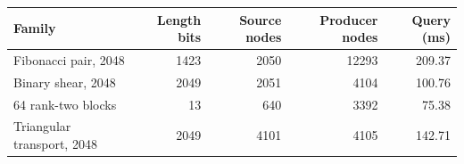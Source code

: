 \begin{center}
\small
\begin{tabular}{lrrrr}
\toprule
Family & Length bits & Source nodes & Producer nodes & Query (ms) \\
\midrule
Fibonacci pair, 2048 & 1423 & 2050 & 12293 & 209.37 \\
Binary shear, 2048 & 2049 & 2051 & 4104 & 100.76 \\
64 rank-two blocks & 13 & 640 & 3392 & 75.38 \\
Triangular transport, 2048 & 2049 & 4101 & 4105 & 142.71 \\
\bottomrule
\end{tabular}
\end{center}
